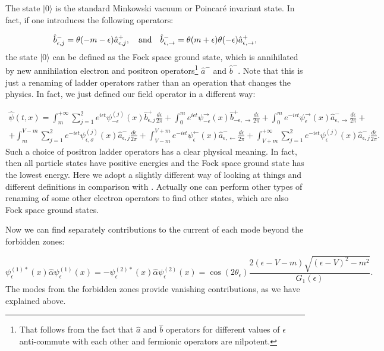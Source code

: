 \documentclass[12pt]{article}
\begin{document}
The state $|0\rangle$ is the standard Minkowski vacuum or Poincar\'e invariant state. In fact, if one introduces the following operators:

\begin{equation}
    \hat{b}^{-}_{\epsilon,j}=\theta(-m-\epsilon)\hat{a}^{+}_{\epsilon,j},\quad {\rm and} \quad
	\hat{b}^{-}_{\epsilon,\rightarrow}=\theta(m+\epsilon)\theta(-\epsilon)\hat{a}^{+}_{\epsilon,\rightarrow},
\end{equation}
the state $|0\rangle$ can be defined as the Fock space ground state, which is annihilated by new annihilation electron and positron operators\footnote{That follows from the fact that $\hat{a}$ and $\hat{b}$ operators for different values of $\epsilon$ anti-commute with each other and fermionic operators are nilpotent.} $\hat{a}^-$ and $\hat{b}^-$. Note that this is just a renaming of ladder operators rather than an operation that changes the physics. In fact, we just defined our field operator in a different way:
	
\begin{gather}
    \hat{\psi}(t,x)=\int^{+\infty}_{m}\sum_{j=1}^2 e^{i\epsilon t}\psi^{(j)}_{-\epsilon}(x)\hat{b}^{+}_{\epsilon,j}\frac{d\epsilon}{2\pi}+\int^{m}_{0}e^{i\epsilon t}\psi^{\rightarrow}_{-\epsilon}(x)\hat{b}^{+}_{-\epsilon,\rightarrow}\frac{d\epsilon}{2\pi}+\int^{m}_{0}e^{-i\epsilon t}\psi^{\rightarrow}_{\epsilon}(x)\hat{a}^{-}_{\epsilon,\rightarrow}\frac{d\epsilon}{2\pi}+\\
	+\int^{V-m}_{m}\sum_{j=1}^2 e^{-i\epsilon t}\psi^{(j)}_{\epsilon,\sigma}(x)\hat{a}^{-}_{\epsilon,j}\frac{d\epsilon}{2\pi}+\int^{V+m}_{V-m}e^{-i\epsilon t}\psi^{\leftarrow}_{\epsilon}(x)\hat{a}^{-}_{\epsilon,\leftarrow}\frac{d\epsilon}{2\pi}+\int_{V+m}^{+\infty}\sum_{j=1}^2 e^{-i\epsilon t}\psi^{(j)}_{\epsilon}(x)\hat{a}^{-}_{\epsilon,j}\frac{d\epsilon}{2\pi}. \nonumber
\end{gather}
Such a choice of positron ladder operators has a clear physical meaning. In fact, then all particle states have positive energies and the Fock space ground state has the lowest energy. Here we adopt a slightly different way of looking at things and different definitions in comparison with \cite{Akhmedov:2025jtk}. Actually one can perform other types of renaming of some other electron operators to find other states, which are also Fock space ground states. 
 
Now we can find separately contributions to the current of each mode beyond the forbidden zones:

\begin{equation}
	\psi^{(1)*}_{\epsilon}(x)\hat{\alpha}\psi^{(1)}_{\epsilon}(x) = - \psi^{(2)*}_{\epsilon}(x)\hat{\alpha}\psi^{(2)}_{\epsilon}(x) = \cos(2\theta_{\epsilon})\frac{2(\epsilon-V-m)\sqrt{(\epsilon-V)^2-m^2}}{G_1(\epsilon)}.
\end{equation}
The modes from the forbidden zones provide vanishing contributions, as we have explained above.
\end{document}
